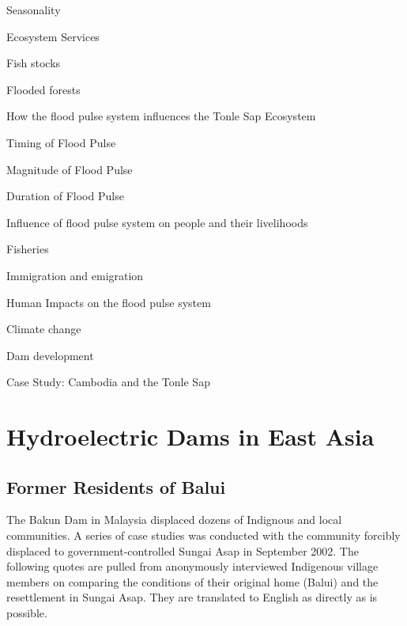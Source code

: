 \documentclass{book}\usepackage{knitr}
\begin{document}
Seasonality

Ecosystem Services

Fish stocks

Flooded forests

How the flood pulse system influences the Tonle Sap Ecosystem

Timing of Flood Pulse

Magnitude of Flood Pulse

Duration of Flood Pulse

Influence of flood pulse system on people and their livelihoods

Fisheries

Immigration and emigration

Human Impacts on the flood pulse system

Climate change

Dam development

Case Study: Cambodia and the Tonle Sap


\chapter{Hydroelectric Dams in East Asia}

\section{Former Residents of Balui}
The Bakun Dam in Malaysia displaced dozens of Indignous and local communities. A series of case studies was conducted with the community forcibly displaced to government-controlled Sungai Asap in September 2002. The following quotes are pulled from anonymously interviewed Indigenous village members on comparing the conditions of their original home (Balui) and the resettlement in Sungai Asap. They are translated to English as directly as is possible. 


\end{document}
